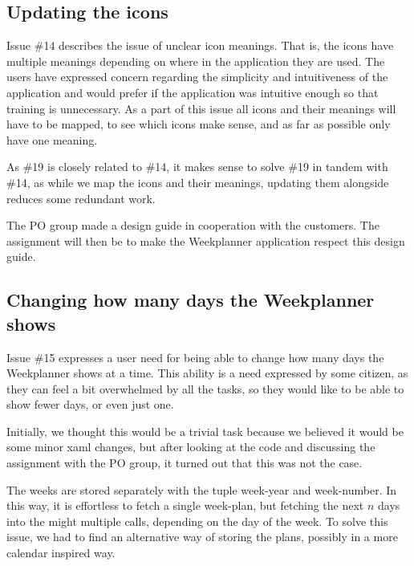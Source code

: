\subsection{Updating the icons}

Issue \#14 describes the issue of unclear icon meanings. That is, the icons have multiple meanings depending on where in the application they are used. The users have expressed concern regarding the simplicity and intuitiveness of the application and would prefer if the application was intuitive enough so that training is unnecessary. As a part of this issue all icons and their meanings will have to be mapped, to see which icons make sense, and as far as possible only have one meaning. 

As \#19 is closely related to \#14, it makes sense to solve \#19 in tandem with \#14, as while we map the icons and their meanings, updating them alongside reduces some redundant work.

The \gls{PO} group made a design guide in cooperation with the customers. The assignment will then be to make the Weekplanner application respect this design guide.

\subsection{Changing how many days the Weekplanner shows} \label{sec:weekPlannerDaysToShow}

Issue \#15 expresses a user need for being able to change how many days the Weekplanner shows at a time. This ability is a need expressed by some citizen, as they can feel a bit overwhelmed by all the tasks, so they would like to be able to show fewer days, or even just one.

Initially, we thought this would be a trivial task because we believed it would be some minor \gls{xaml} changes, but after looking at the code and discussing the assignment with the \gls{PO} group, it turned out that this was not the case. 

The weeks are stored separately with the tuple week-year and week-number. In this way, it is effortless to fetch a single week-plan, but fetching the next $n$ days into the might multiple calls, depending on the day of the week. To solve this issue, we had to find an alternative way of storing the plans, possibly in a more calendar inspired way.
